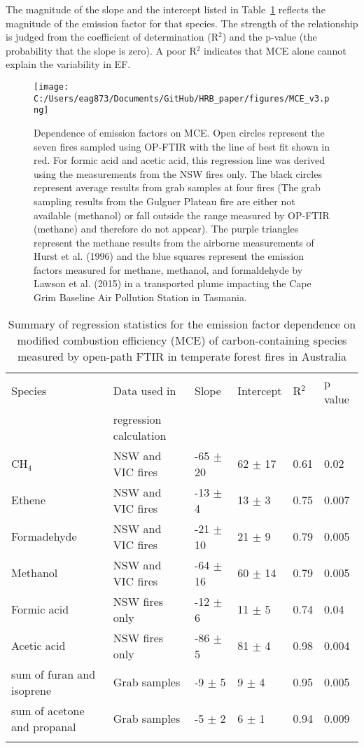 \documentclass[acp, manuscript]{copernicus}
\begin{document}
The magnitude of the slope and the intercept listed in Table~\ref{table:MCE_dep} reflects the magnitude of the emission factor for that species. The strength of the relationship is judged from the coefficient of determination (R$^2$) and the p-value (the probability that the slope is zero). A poor R$^2$ indicates that MCE alone cannot explain the variability in EF. 

\begin{figure}
  \texttt{[image: C:/Users/eag873/Documents/GitHub/HRB\_paper/figures/MCE\_v3.png]}
  \caption{Dependence of emission factors on MCE. Open circles represent the seven fires sampled using OP-FTIR with the line of best fit shown in red. For formic acid and acetic acid, this regression line was derived using the measurements from the NSW fires only. The black circles represent average results from grab samples at four fires (The grab sampling results from the Gulguer Plateau fire are either not available (methanol) or fall outside the range measured by OP-FTIR (methane) and therefore do not appear). The purple triangles represent the methane results from the airborne measurements of Hurst et al. (1996) and the blue squares represent the emission factors measured for methane, methanol, and formaldehyde by Lawson et al. (2015) in a transported plume impacting the Cape Grim Baseline Air Pollution Station in Tasmania.
  }
  \label{fig:MCE_dep}
\end{figure}

\begin{table}
    \caption{Summary of regression statistics for the emission factor dependence on modified combustion efficiency (MCE) of carbon-containing species measured by open-path FTIR in temperate forest fires in Australia}
  \begin{tabular}{l l l l l l } 
    \tophline
   Species & Data used in &  Slope & Intercept & R$^2$ & p value \\
   & regression calculation &&& &\\
   \hline
  CH$_4$& NSW and VIC fires & -65 $\pm$ 20 & 62 $\pm$ 17 & 0.61& 0.02 \\ 
  Ethene & NSW and VIC fires& -13 $\pm$ 4 & 13 $\pm$ 3 & 0.75 & 0.007 \\
  Formadehyde & NSW and VIC fires& -21 $\pm$ 10& 21 $\pm$ 9& 0.79 & 0.005\\
  Methanol  & NSW and VIC fires& -64 $\pm$ 16 & 60 $\pm$ 14 & 0.79 & 0.005\\
  Formic acid  & NSW fires only & -12 $\pm$ 6& 11 $\pm$ 5 & 0.74 & 0.04\\ 
  Acetic acid  & NSW fires only & -86 $\pm$ 5 & 81 $\pm$ 4 & 0.98 & 0.004 \\ 
  sum of furan and isoprene & Grab samples & -9 $\pm$ 5 & 9 $\pm$ 4 & 0.95 & 0.005 \\ 
  sum of acetone and propanal & Grab samples & -5 $\pm$ 2& 6 $\pm$ 1& 0.94 & 0.009 \\ 
    \bottomhline
  \end{tabular}
  \label{table:MCE_dep}
  \belowtable{} %
\end{table}
\end{document}
